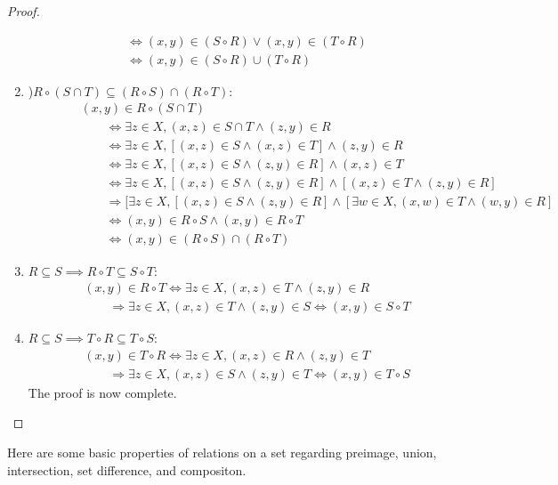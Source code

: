 \documentclass[
  letterpaper,
  10pt,
  reqno,
  twopage,
  openany]{book}
\theoremstyle{plain}
\theoremstyle{definition}
\theoremstyle{definition}
\theoremstyle{definition}
\theoremstyle{plain}
\theoremstyle{plain}
\theoremstyle{remark}
\begin{document}
\begin{proof}
\begin{enumerate}
\begin{align*}
  & \Longleftrightarrow (x,y)\in (S\circ R) \lor (x,y)\in (T\circ R)\\
  & \Longleftrightarrow (x,y)\in (S\circ R)\cup (T\circ R)
  \end{align*}
\item
  )\(R\circ (S\cap T) \subseteq (R\circ S)\cap (R\circ T)\):
  \begin{align*}
  \qquad \quad  & (x,y) \in R\circ (S\cap T)  \\
  & \qquad \Longleftrightarrow \exists z\in X, (x,z)\in S\cap T \land (z,y)\in R \\
  & \qquad \Longleftrightarrow \exists z\in X, [(x,z)\in S \land (x,z)\in T] \land (z,y)\in R \\
  & \qquad \Longleftrightarrow \exists z\in X, [(x,z)\in S \land (z,y)\in R] \land (x,z)\in T\\
  & \qquad \Longleftrightarrow \exists z\in X, [(x,z)\in S \land (z,y)\in R] \land [(x,z)\in T \land (z,y)\in R] \\
  & \qquad \Longrightarrow [\exists z\in X, [(x,z)\in S \land (z,y)\in R] \land [ \exists w\in X, (x,w)\in T \land (w,y)\in R]\\
  & \qquad \Longleftrightarrow (x,y)\in R\circ S \land (x,y)\in R\circ T \\
  & \qquad \Longleftrightarrow (x,y)\in (R\circ S) \cap (R\circ T)
  \end{align*}
\item
  \(R\subseteq S \implies R\circ T \subseteq S\circ T\): \begin{align*}
  & (x,y)\in R\circ T \Longleftrightarrow \exists z\in X, (x,z)\in T \land (z,y)\in R \\ 
  & \qquad \Longrightarrow \exists z\in X, (x,z)\in T \land (z,y)\in S \Longleftrightarrow (x,y)\in S\circ T
  \end{align*}
\item
  \(R\subseteq S \implies T\circ R \subseteq T\circ S\): \begin{align*}
  & (x,y)\in T\circ R \Longleftrightarrow \exists z\in X, (x,z)\in R \land (z,y)\in T \\ 
  & \qquad \Longrightarrow \exists z\in X, (x,z)\in S \land (z,y)\in T \Longleftrightarrow (x,y)\in T\circ S
  \end{align*} The proof is now complete.
\end{enumerate}

\end{proof}

Here are some basic properties of relations on a set regarding preimage,
union, intersection, set difference, and compositon.
\end{document}
